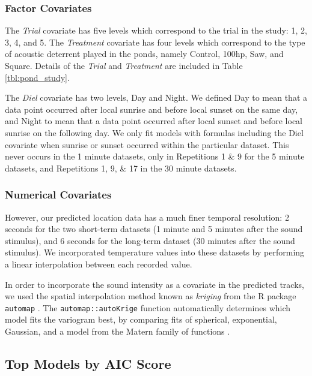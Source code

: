 \documentclass[12pt]{article}
\begin{document}
	\subsubsection{Factor Covariates}
	
	The \emph{Trial} covariate has five levels which correspond to the trial in the study: 1, 2, 3, 4, and 5. The \emph{Treatment} covariate has four levels which correspond to the type of acoustic deterrent played in the ponds, namely Control, 100hp, Saw, and Square. Details of the \emph{Trial} and \emph{Treatment} are included in Table \ref{tbl:pond_study}.
	
	The \emph{Diel} covariate has two levels, Day and Night. We defined Day to mean that a data point occurred after local sunrise and before local sunset on the same day, and Night to mean that a data point occurred after local sunset and before local sunrise on the following day. We only fit models with formulas including the Diel covariate when sunrise or sunset occurred within the particular dataset. This never occurs in the 1 minute datasets, only in Repetitions 1 \& 9 for the 5 minute datasets, and Repetitions 1, 9, \& 17 in the 30 minute datasets.
	
	\subsubsection{Numerical Covariates} \label{sec:num-cov}
	
	 However, our predicted location data has a much finer temporal resolution: 2 seconds for the two short-term datasets (1 minute and 5 minutes after the sound stimulus), and 6 seconds for the long-term dataset (30 minutes after the sound stimulus). We incorporated temperature values into these datasets by performing a linear interpolation between each recorded value.
	 
	In order to incorporate the sound intensity as a covariate in the predicted tracks, we used the spatial interpolation method known as \emph{kriging} from the R package \texttt{automap} \cite{Hiemstra2008}. The \texttt{automap::autoKrige} function automatically determines which model fits the variogram best, by comparing fits of spherical, exponential, Gaussian, and a model from the Matern family of functions \cite{Hiemstra2008}.
	
	\subsection{Top Models by AIC Score}
	
\end{document}
